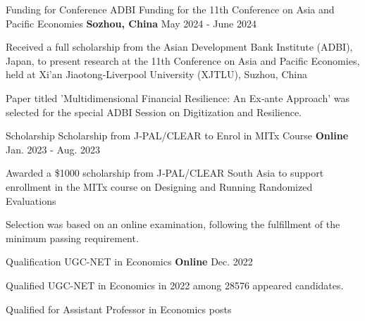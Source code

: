 \begin{cventries}
\cventry
{Funding for Conference} %
{ADBI Funding for the 11th Conference on Asia and Pacific Economies} %
{\textbf{Sozhou, China}} %
{May 2024 - June 2024} %
{ %
\begin{cvitems}
\item {Received a full scholarship from the Asian Development Bank Institute (ADBI), Japan, to present research at the 11th Conference on Asia and Pacific Economies, held at Xi’an Jiaotong‑Liverpool University (XJTLU), Suzhou, China}
\item {Paper titled 'Multidimensional Financial Resilience: An Ex‑ante Approach' was selected for the special ADBI Session on Digitization and Resilience.}
\end{cvitems}
}

\cventry
{Scholarship} %
{Scholarship from J‑PAL/CLEAR to Enrol in MITx Course } %
{\textbf{Online}} %
{Jan. 2023 - Aug. 2023} %
{ %
\begin{cvitems}
\item {Awarded a \$1000 scholarship from J‑PAL/CLEAR South Asia to support enrollment in the MITx course on Designing and Running Randomized Evaluations}
\item {Selection was based on an online examination, following the fulfillment of the minimum passing requirement.}
\end{cvitems}
}

\cventry
{Qualification} %
{UGC-NET in Economics } %
{\textbf{Online}} %
{Dec. 2022} %
{ %
\begin{cvitems}
\item {Qualified UGC-NET in Economics in 2022 among 28576 appeared candidates.}
\item {Qualified for Assistant Professor in Economics posts}
\end{cvitems}
}


\end{cventries}
